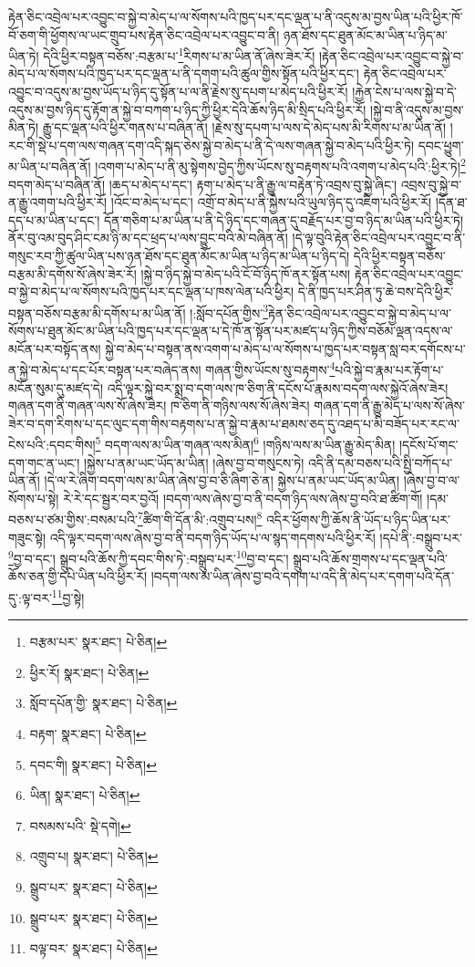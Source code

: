 རྟེན་ཅིང་འབྲེལ་པར་འབྱུང་བ་སྐྱེ་བ་མེད་པ་ལ་སོགས་པའི་ཁྱད་པར་དང་ལྡན་པ་ནི་འདུས་མ་བྱས་ཡིན་པའི་ཕྱིར་ཁོ་བོ་ཅག་གི་ཕྱོགས་ལ་ཡང་གྲུབ་པས་རྟེན་ཅིང་འབྲེལ་པར་འབྱུང་བ་ནི། ཉན་ཐོས་དང་ཐུན་མོང་མ་ཡིན་པ་ཉིད་མ་ཡིན་ཏེ། དེའི་ཕྱིར་བསྟན་བཅོས་:བརྩམ་པ་\footnote{བརྩམ་པར་  སྣར་ཐང་།  པེ་ཅིན། }རིགས་པ་མ་ཡིན་ནོ་ཞེས་ཟེར་རོ། །རྟེན་ཅིང་འབྲེལ་པར་འབྱུང་བ་སྐྱེ་བ་མེད་པ་ལ་སོགས་པའི་ཁྱད་པར་དང་ལྡན་པ་ནི་དགག་པའི་ཚུལ་གྱིས་སྟོན་པའི་ཕྱིར་དང་། རྟེན་ཅིང་འབྲེལ་པར་འབྱུང་བ་འདུས་མ་བྱས་ཡོད་པ་ཉིད་དུ་སྟོན་པ་ལ་ནི་རྗེས་སུ་དཔག་པ་མེད་པའི་ཕྱིར་རོ། །རྐྱེན་ངེས་པ་ལས་སྐྱེ་བ་དེ་འདུས་མ་བྱས་ཉིད་དུ་རྟོག་ན་སྐྱེ་བ་བཀག་པ་ཉིད་ཀྱི་ཕྱིར་དེའི་ཆོས་ཉིད་མི་སྲིད་པའི་ཕྱིར་རོ། །སྐྱེ་བ་ནི་འདུས་མ་བྱས་མིན་ཏེ། རྒྱུ་དང་ལྡན་པའི་ཕྱིར་གནས་པ་བཞིན་ནོ། །རྗེས་སུ་དཔག་པ་ལས་དེ་མེད་པས་མི་རིགས་པ་མ་ཡིན་ནོ། །རང་གི་སྡེ་པ་དག་ལས་གཞན་དག་འདི་སྐད་ཅེས་སྐྱེ་བ་མེད་པ་ནི་དེ་ལས་གཞན་སྐྱེ་བ་མེད་པའི་ཕྱིར་ཏེ། དབང་ཕྱུག་མ་ཡིན་པ་བཞིན་ནོ། །འགག་པ་མེད་པ་ནི་མུ་སྟེགས་བྱེད་ཀྱིས་ཡོངས་སུ་བརྟགས་པའི་འགག་པ་མེད་པའི་:ཕྱིར་ཏེ།\footnote{ཕྱིར་རོ།  སྣར་ཐང་།  པེ་ཅིན། } བདག་མེད་པ་བཞིན་ནོ། །ཆད་པ་མེད་པ་དང་། རྟག་པ་མེད་པ་ནི་རྒྱུ་ལ་བརྟེན་ཏེ་འབྲས་བུ་སྐྱེ་ཞིང་། འབྲས་བུ་སྐྱེ་བ་ན་རྒྱུ་འགག་པའི་ཕྱིར་རོ། །འོང་བ་མེད་པ་དང་། འགྲོ་བ་མེད་པ་ནི་སྐྱེས་པའི་ཡུལ་ཉིད་དུ་འཇིག་པའི་ཕྱིར་རོ། །དོན་ཐ་དད་པ་མ་ཡིན་པ་དང་། དོན་གཅིག་པ་མ་ཡིན་པ་ནི་དེ་ཉིད་དང་གཞན་དུ་བརྗོད་པར་བྱ་བ་ཉིད་མ་ཡིན་པའི་ཕྱིར་ཏེ། ནོར་བུ་འམ་བུད་ཤིང་ངམ་ཉི་མ་དང་ཕྲད་པ་ལས་བྱུང་བའི་མེ་བཞིན་ནོ། །དེ་ལྟ་བུའི་རྟེན་ཅིང་འབྲེལ་པར་འབྱུང་བ་ནི་གསུང་རབ་ཀྱི་ཚུལ་ཡིན་པས་ཉན་ཐོས་དང་ཐུན་མོང་མ་ཡིན་པ་ཉིད་མ་ཡིན་པ་ཉིད་དེ། དེའི་ཕྱིར་བསྟན་བཅོས་བརྩམ་མི་དགོས་སོ་ཞེས་ཟེར་རོ། །སྐྱེ་བ་ཉིད་སྐྱེ་བ་མེད་པའི་ངོ་བོ་ཉིད་ཁོ་ནར་སྟོན་པས། རྟེན་ཅིང་འབྲེལ་པར་འབྱུང་བ་སྐྱེ་བ་མེད་པ་ལ་སོགས་པའི་ཁྱད་པར་དང་ལྡན་པ་ཁས་ལེན་པའི་ཕྱིར། དེ་ནི་ཁྱད་པར་ཤིན་ཏུ་ཆེ་བས་དེའི་ཕྱིར་བསྟན་བཅོས་བརྩམ་མི་དགོས་པ་མ་ཡིན་ནོ། །:སློབ་དཔོན་གྱིས་\footnote{སློབ་དཔོན་གྱི་  སྣར་ཐང་།  པེ་ཅིན། }རྟེན་ཅིང་འབྲེལ་པར་འབྱུང་བ་སྐྱེ་བ་མེད་པ་ལ་སོགས་པ་ཐུན་མོང་མ་ཡིན་པའི་ཁྱད་པར་དང་ལྡན་པ་དེ་ཁོ་ན་སྟོན་པར་མཛད་པ་ཉིད་ཀྱིས་བཅོམ་ལྡན་འདས་ལ་མངོན་པར་བསྟོད་ནས། སྐྱེ་བ་མེད་པ་བསྟན་ནས་འགག་པ་མེད་པ་ལ་སོགས་པ་ཁྱད་པར་བསྟན་སླ་བར་དགོངས་པ་ན་སྐྱེ་བ་མེད་པ་དང་པོར་བསྟན་པར་བཞེད་ནས། གཞན་གྱིས་ཡོངས་སུ་བརྟགས་\footnote{བརྟག་  སྣར་ཐང་།  པེ་ཅིན། }པའི་སྐྱེ་བ་རྣམ་པར་རྟོག་པ་མངོན་སུམ་དུ་མཛད་དེ། འདི་ལྟར་སྐྱེ་བར་སྨྲ་བ་དག་ལས་ཁ་ཅིག་ནི་དངོས་པོ་རྣམས་བདག་ལས་སྐྱེའོ་ཞེས་ཟེར། གཞན་དག་ནི་གཞན་ལས་སོ་ཞེས་ཟེར། ཁ་ཅིག་ནི་གཉིས་ལས་སོ་ཞེས་ཟེར། གཞན་དག་ནི་རྒྱུ་མེད་པ་ལས་སོ་ཞེས་ཟེར་བ་དག་རིགས་པ་དང་ལུང་དག་གིས་བརྟགས་པ་ན་སྐྱེ་བ་རྣམ་པ་ཐམས་ཅད་དུ་འཐད་པ་མི་བཟོད་པར་རང་ལ་ངེས་པའི་:དབང་གིས།\footnote{དབང་གི།  སྣར་ཐང་།  པེ་ཅིན། } བདག་ལས་མ་ཡིན་གཞན་ལས་མིན།\footnote{ཡིན།  སྣར་ཐང་།  པེ་ཅིན། } །གཉིས་ལས་མ་ཡིན་རྒྱུ་མེད་མིན། །དངོས་པོ་གང་དག་གང་ན་ཡང་། །སྐྱེས་པ་ནམ་ཡང་ཡོད་མ་ཡིན། །ཞེས་བྱ་བ་གསུངས་ཏེ། འདི་ནི་དམ་བཅས་པའི་སྤྱི་བཀོད་པ་ཡིན་ནོ། །དེ་ལ་རེ་ཞིག་བདག་ལས་མ་ཡིན་ཞེས་བྱ་བ་ཅི་ཞིག་ཅེ་ན། སྐྱེས་པ་ནམ་ཡང་ཡོད་མ་ཡིན། །ཞེས་བྱ་བ་ལ་སོགས་པ་སྟེ། རེ་རེ་དང་སྦྱར་བར་བྱའོ། །བདག་ལས་ཞེས་བྱ་བ་ནི་བདག་ཉིད་ལས་ཞེས་བྱ་བའི་ཐ་ཚིག་གོ། །དམ་བཅས་པ་ཙམ་གྱིས་:བསམ་པའི་\footnote{བསམས་པའི་  སྡེ་དགེ། }ཚིག་གི་དོན་མི་:འགྲུབ་པས།\footnote{འགྲུབ་པ།  སྣར་ཐང་།  པེ་ཅིན། } འདིར་ཕྱོགས་ཀྱི་ཆོས་ནི་ཡོད་པ་ཉིད་ཡིན་པར་གཟུང་སྟེ། འདི་ལྟར་བདག་ལས་ཞེས་བྱ་བ་ནི་བདག་ཉིད་ཡོད་པ་ལ་སྙད་གདགས་པའི་ཕྱིར་རོ། །དཔེ་ནི་:བསྒྲུབ་པར་\footnote{སྒྲུབ་པར་  སྣར་ཐང་།  པེ་ཅིན། }བྱ་བ་དང་། སྒྲུབ་པའི་ཆོས་ཀྱི་དབང་གིས་ཏེ་:བསྒྲུབ་པར་\footnote{སྒྲུབ་པར་  སྣར་ཐང་།  པེ་ཅིན། }བྱ་བ་དང་། སྒྲུབ་པའི་ཆོས་གྲགས་པ་དང་ལྡན་པའི་ཆོས་ཅན་གྱི་དཔེ་ཡིན་པའི་ཕྱིར་རོ། །བདག་ལས་མ་ཡིན་ཞེས་བྱ་བའི་དགག་པ་འདི་ནི་མེད་པར་དགག་པའི་དོན་དུ་:ལྟ་བར་\footnote{བལྟ་བར་  སྣར་ཐང་།  པེ་ཅིན། }བྱ་སྟེ། 